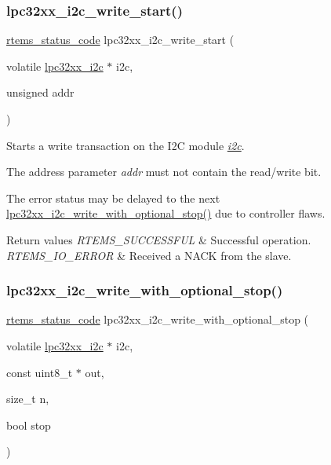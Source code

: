 \subsubsection{\texorpdfstring{lpc32xx\_i2c\_write\_start()}{lpc32xx\_i2c\_write\_start()}}
{\footnotesize\ttfamily \mbox{\hyperlink{group__ClassicStatus_ga545d41846817eaba6143d52ee4d9e9fe}{rtems\+\_\+status\+\_\+code}} lpc32xx\+\_\+i2c\+\_\+write\+\_\+start (\begin{DoxyParamCaption}\item[{volatile \mbox{\hyperlink{structlpc32xx__i2c}{lpc32xx\+\_\+i2c}} $\ast$}]{i2c,  }\item[{unsigned}]{addr }\end{DoxyParamCaption})}



Starts a write transaction on the I2C module {\itshape \mbox{\hyperlink{structi2c}{i2c}}}. 

The address parameter {\itshape addr} must not contain the read/write bit.

The error status may be delayed to the next \mbox{\hyperlink{group__lpc32xx__i2c_gaa9648954851cae9bfb3a08716c2f8e99}{lpc32xx\+\_\+i2c\+\_\+write\+\_\+with\+\_\+optional\+\_\+stop()}} due to controller flaws.


\begin{DoxyRetVals}{Return values}
{\em R\+T\+E\+M\+S\+\_\+\+S\+U\+C\+C\+E\+S\+S\+F\+UL} & Successful operation. \\
\hline
{\em R\+T\+E\+M\+S\+\_\+\+I\+O\+\_\+\+E\+R\+R\+OR} & Received a N\+A\+CK from the slave. \\
\hline
\end{DoxyRetVals}
\mbox{\label{group__lpc32xx__i2c_gaa9648954851cae9bfb3a08716c2f8e99}} 
\subsubsection{\texorpdfstring{lpc32xx\_i2c\_write\_with\_optional\_stop()}{lpc32xx\_i2c\_write\_with\_optional\_stop()}}
{\footnotesize\ttfamily \mbox{\hyperlink{group__ClassicStatus_ga545d41846817eaba6143d52ee4d9e9fe}{rtems\+\_\+status\+\_\+code}} lpc32xx\+\_\+i2c\+\_\+write\+\_\+with\+\_\+optional\+\_\+stop (\begin{DoxyParamCaption}\item[{volatile \mbox{\hyperlink{structlpc32xx__i2c}{lpc32xx\+\_\+i2c}} $\ast$}]{i2c,  }\item[{const uint8\+\_\+t $\ast$}]{out,  }\item[{size\+\_\+t}]{n,  }\item[{bool}]{stop }\end{DoxyParamCaption})}



